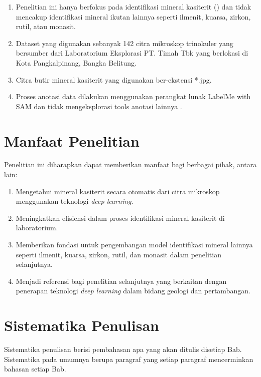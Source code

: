 \begin{enumerate}[noitemsep]
	\item Penelitian ini hanya berfokus pada identifikasi mineral kasiterit (\senyawatin) dan tidak mencakup identifikasi mineral ikutan lainnya seperti ilmenit, kuarsa, zirkon, rutil, atau monasit.
	\item Dataset yang digunakan sebanyak 142 citra mikroskop trinokuler yang bersumber  dari Laboratorium Eksplorasi PT. Timah Tbk yang berlokasi di Kota Pangkalpinang, Bangka Belitung.
	\item Citra butir mineral kasiterit yang digunakan ber-ekstensi *.jpg.
	\item Proses anotasi data dilakukan menggunakan perangkat lunak LabelMe with SAM dan tidak mengeksplorasi tools anotasi lainnya \cite{Wada_Labelme_Image_Polygonal}.
\end{enumerate}

\section{Manfaat Penelitian} \label{I.Manfaat}
Penelitian ini diharapkan dapat memberikan manfaat bagi berbagai pihak, antara lain:

\begin{enumerate}[noitemsep]
	\item Mengetahui mineral kasiterit secara otomatis dari citra mikroskop menggunakan teknologi \textit{deep learning}.
	\item Meningkatkan efisiensi dalam proses identifikasi mineral kasiterit di laboratorium.
	\item Memberikan fondasi untuk pengembangan model identifikasi mineral lainnya seperti ilmenit, kuarsa, zirkon, rutil, dan monasit dalam penelitian selanjutnya.
	\item Menjadi referensi bagi penelitian selanjutnya yang berkaitan dengan penerapan teknologi \textit{deep learning} dalam bidang geologi dan pertambangan.
\end{enumerate}

\section{Sistematika Penulisan} \label{I.Sistematika}
Sistematika penulisan berisi pembahasan apa yang akan ditulis disetiap Bab. Sistematika pada umumnya berupa paragraf yang setiap paragraf mencerminkan bahasan setiap Bab. \par

